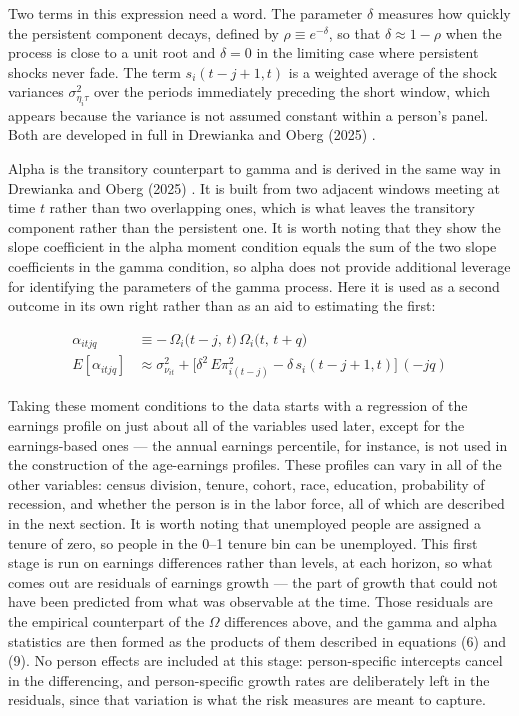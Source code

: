 \documentclass[12pt]{article}
\begin{document}
\begin{onehalfspace}
Two terms in this expression need a word. The parameter $\delta$ measures how quickly the persistent component decays, defined by $\rho \equiv e^{-\delta}$, so that $\delta \approx 1 - \rho$ when the process is close to a unit root and $\delta = 0$ in the limiting case where persistent shocks never fade. The term $s_i(t-j+1,t)$ is a weighted average of the shock variances $\sigma^2_{\eta_i \tau}$ over the periods immediately preceding the short window, which appears because the variance is not assumed constant within a person's panel. Both are developed in full in Drewianka and Oberg (2025) \cite{drewianka2025}.

Alpha is the transitory counterpart to gamma and is derived in the same way in Drewianka and Oberg (2025) \cite{drewianka2025}. It is built from two adjacent windows meeting at time $t$ rather than two overlapping ones, which is what leaves the transitory component rather than the persistent one. It is worth noting that they show the slope coefficient in the alpha moment condition equals the sum of the two slope coefficients in the gamma condition, so alpha does not provide additional leverage for identifying the parameters of the gamma process. Here it is used as a second outcome in its own right rather than as an aid to estimating the first:

\vspace{-0.75cm}

\begin{align}
\alpha_{itjq}
&\equiv -\,\Omega_i\bigl(t-j,\,t\bigr)\,\Omega_i\bigl(t,\,t+q\bigr) \\[1ex]
E[\alpha_{itjq}]
&\approx
\sigma^2_{\nu_{it}}
+ \bigl[\delta^2\,E\pi^2_{i(t-j)} - \delta\,s_i(t-j+1,t)\bigr]\,(-jq)
\end{align}



Taking these moment conditions to the data starts with a regression of the earnings profile on just about all of the variables used later, except for the earnings-based ones --- the annual earnings percentile, for instance, is not used in the construction of the age-earnings profiles. These profiles can vary in all of the other variables: census division, tenure, cohort, race, education, probability of recession, and whether the person is in the labor force, all of which are described in the next section. It is worth noting that unemployed people are assigned a tenure of zero, so people in the 0--1 tenure bin can be unemployed. This first stage is run on earnings differences rather than levels, at each horizon, so what comes out are residuals of earnings growth --- the part of growth that could not have been predicted from what was observable at the time. Those residuals are the empirical counterpart of the $\Omega$ differences above, and the gamma and alpha statistics are then formed as the products of them described in equations (6) and (9). No person effects are included at this stage: person-specific intercepts cancel in the differencing, and person-specific growth rates are deliberately left in the residuals, since that variation is what the risk measures are meant to capture.


\end{onehalfspace}
\end{document}
